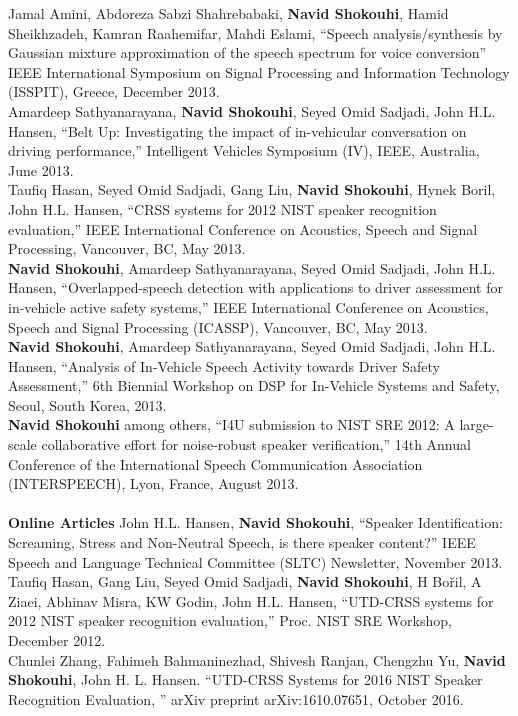 	Jamal Amini, Abdoreza Sabzi Shahrebabaki, {\bf Navid Shokouhi}, Hamid Sheikhzadeh, Kamran Raahemifar, Mahdi Eslami,  ``Speech analysis/synthesis by Gaussian mixture approximation of the speech spectrum for voice conversion'' IEEE International Symposium on Signal Processing and Information Technology (ISSPIT), Greece, December 2013.\\
	
	Amardeep Sathyanarayana, {\bf Navid Shokouhi}, Seyed Omid Sadjadi, John H.L. Hansen, ``Belt Up: Investigating the impact of in-vehicular conversation on driving performance,'' Intelligent Vehicles Symposium (IV), IEEE, Australia, June 2013. \\
	
	Taufiq Hasan, Seyed Omid Sadjadi, Gang Liu, {\bf Navid Shokouhi}, Hynek Boril, John H.L. Hansen, ``CRSS systems for 2012 NIST speaker recognition evaluation,'' IEEE International Conference on Acoustics, Speech and Signal Processing, Vancouver, BC, May 2013. \\
	
	{\bf Navid Shokouhi}, Amardeep Sathyanarayana, Seyed Omid Sadjadi, John H.L. Hansen, ``Overlapped-speech detection with applications to driver assessment for in-vehicle active safety systems,'' IEEE International Conference on Acoustics, Speech and Signal Processing (ICASSP), Vancouver, BC, May 2013. \\
	
	{\bf Navid Shokouhi}, Amardeep Sathyanarayana, Seyed Omid Sadjadi, John H.L. Hansen, ``Analysis of In-Vehicle Speech Activity towards Driver Safety Assessment,'' 6th Biennial Workshop on DSP for In-Vehicle Systems and Safety, Seoul, South Korea, 2013.\\
	
	{\bf Navid Shokouhi} among others, ``I4U submission to NIST SRE 2012: A large-scale collaborative effort for noise-robust speaker verification,'' 14th Annual Conference of the International Speech Communication Association (INTERSPEECH), Lyon, France, August 2013.\\\\
	
	\textbf{\sc Online Articles}
	John H.L. Hansen, {\bf Navid Shokouhi}, ``Speaker Identification: Screaming, Stress and Non-Neutral Speech, is there speaker content?'' IEEE Speech and Language Technical Committee (SLTC) Newsletter, November 2013.\\
	
	Taufiq Hasan, Gang Liu, Seyed Omid Sadjadi, {\bf Navid Shokouhi}, H Bořil, A Ziaei, Abhinav Misra, KW Godin, John H.L. Hansen, ``UTD-CRSS systems for 2012 NIST speaker recognition evaluation,'' Proc. NIST SRE Workshop, December 2012. \\
	
	Chunlei Zhang, Fahimeh Bahmaninezhad, Shivesh Ranjan, Chengzhu Yu, {\bf Navid Shokouhi}, John H. L. Hansen. ``UTD-CRSS Systems for 2016 NIST Speaker Recognition Evaluation, '' arXiv preprint arXiv:1610.07651, October 2016. 
	

